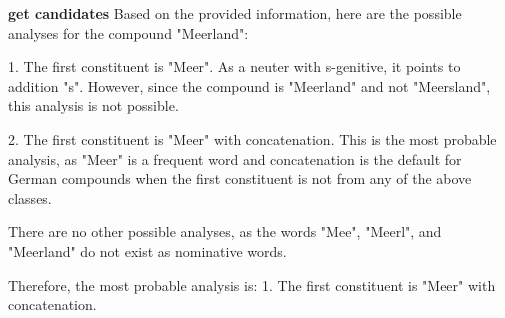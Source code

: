 \documentclass[11pt]{article}
\begin{document}
\begin{center}
    \begin{tcolorbox}[colback=gray!10, colframe=black, width=\linewidth, left=1mm, right=1mm, title=Candidates for \texttt{meer\_land} from \textit{Llama-instruct\textsubscript{+cand+par}}]
        
        \begin{aimessage}{\textbf{get candidates}}
            Based on the provided information, here are the possible analyses for the compound "Meerland":
            
            1. The first constituent is "Meer". As a neuter with s-genitive, it points to addition "s". However, since the compound is "Meerland" and not "Meersland", this analysis is not possible.
            
            2. The first constituent is "Meer" with concatenation. This is the most probable analysis, as "Meer" is a frequent word and concatenation is the default for German compounds when the first constituent is not from any of the above classes.
            
            There are no other possible analyses, as the words "Mee", "Meerl", and "Meerland" do not exist as nominative words.
            
            Therefore, the most probable analysis is: 1. The first constituent is "Meer" with concatenation.
        \end{aimessage}
        
        
    \end{tcolorbox}
\end{center}
\label{chat:meerland_cand_par}
\end{document}

